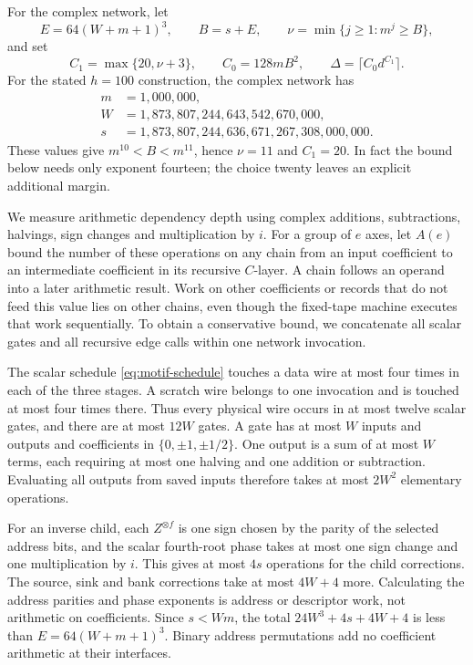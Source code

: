 For the complex network, let
\[
 E=64(W+m+1)^3,\qquad B=s+E,
 \qquad \nu=\min\{j\ge1:m^j\ge B\},
\]
and set
\[
 C_1=\max\{20,\nu+3\},\qquad C_0=128mB^2,
 \qquad \Delta=\lceil C_0d^{C_1}\rceil.
\]
For the stated \(h=100\) construction, the complex network has
\[
\begin{split}
 m&=1{,}000{,}000,\\
 W&=1{,}873{,}807{,}244{,}643{,}542{,}670{,}000,\\
 s&=1{,}873{,}807{,}244{,}636{,}671{,}267{,}308{,}000{,}000.
\end{split}
\]
These values give \(m^{10}<B<m^{11}\), hence \(\nu=11\) and
\(C_1=20\).  In fact the bound below needs only exponent fourteen;
the choice twenty leaves an explicit additional margin.

We measure arithmetic dependency depth using complex additions,
subtractions, halvings, sign changes and multiplication by \(i\).
For a group of \(e\) axes, let \(A(e)\) bound the number of these
operations on any chain from an input coefficient to an intermediate
coefficient in its recursive \(C\)-layer.  A chain follows an operand
into a later arithmetic result.  Work on other coefficients or records
that do not feed this value lies on other chains, even though the
fixed-tape machine executes that work sequentially.  To obtain a
conservative bound, we concatenate all scalar gates and all recursive
edge calls within one network invocation.

The scalar schedule \eqref{eq:motif-schedule} touches a data wire
at most four times in each of the three stages.  A scratch wire belongs
to one invocation and is touched at most four times there.  Thus every
physical wire occurs in at most twelve scalar gates, and there are
at most \(12W\) gates.  A gate has at most \(W\) inputs and outputs
and coefficients in \(\{0,\pm1,\pm1/2\}\).  One output is a sum of
at most \(W\) terms, each requiring at most one halving and one
addition or subtraction.  Evaluating all outputs from saved inputs
therefore takes at most \(2W^2\) elementary operations.

For an inverse child, each \(Z^{\otimes f}\) is one sign chosen by
the parity of the selected address bits, and the scalar fourth-root
phase takes at most one sign change and one multiplication by \(i\).
This gives at most \(4s\) operations for the child corrections.
The source, sink and bank corrections take at most \(4W+4\) more.
Calculating the address parities and phase exponents is address or descriptor
work, not arithmetic on coefficients.  Since \(s<Wm\), the total
\(24W^3+4s+4W+4\) is less than
\(E=64(W+m+1)^3\).  Binary address permutations add no coefficient
arithmetic at their interfaces.

